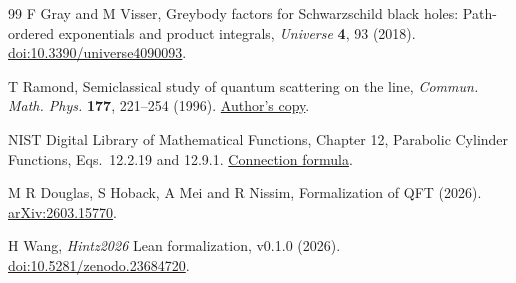 \documentclass[11pt]{article}
\begin{document}
\begin{thebibliography}{99}
F Gray and M Visser, Greybody factors for Schwarzschild black holes:
Path-ordered exponentials and product integrals,
\emph{Universe} \textbf{4}, 93 (2018).
\href{https://doi.org/10.3390/universe4090093}{doi:10.3390/universe4090093}.

T Ramond, Semiclassical study of quantum scattering on the line,
\emph{Commun. Math. Phys.} \textbf{177}, 221--254 (1996).
\href{https://www.imo.universite-paris-saclay.fr/~thierry.ramond/docs/articles/sqscmp.pdf}{Author's copy}.

NIST Digital Library of Mathematical Functions, Chapter 12,
Parabolic Cylinder Functions, Eqs.\ 12.2.19 and 12.9.1.
\href{https://dlmf.nist.gov/12.2.E19}{Connection formula}.

M R Douglas, S Hoback, A Mei and R Nissim, Formalization of QFT (2026).
\href{https://arxiv.org/abs/2603.15770}{arXiv:2603.15770}.

H Wang, \emph{Hintz2026} Lean formalization, v0.1.0 (2026).
\href{https://doi.org/10.5281/zenodo.23684720}{doi:10.5281/zenodo.23684720}.

\end{thebibliography}
\end{document}
